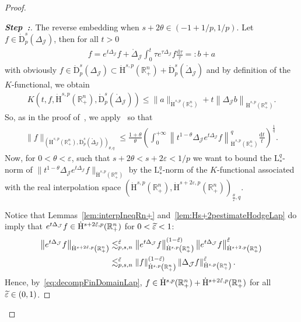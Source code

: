 \documentclass[AHL,Unicode,longabstracts,published]{cedram}
\newcommand{\bbR}{\mathbb{R}}
\newcommand{\rmH}{\mathrm{H}}%
\newcommand{\rmd}{\mathrm{d}}
\newcommand{\rmD}{\mathrm{D}}
\newcommand{\rmL}{\mathrm{L}}
\newcommand{\clJ}{\mathcal{J}}
\newcounter{stepcount}
\newenvironment{step}{\refstepcounter{stepcount}\begin{proof}[\textbf{Step~\thestepcount:}]}{\let\qed\relax\end{proof}}
\let\oldtilde\tilde
\renewcommand*{\tilde}[1]{\mathchoice{\widetilde{#1}}{\widetilde{#1}}{\oldtilde{#1}}{\oldtilde{#1}}}
\begin{document}
\begin{proof}
\begin{step}\label{prfprop3.12stp2}
The reverse embedding when $s+2\theta\in(-1+1/p,1/p)$. Let $f\in \dot{\rmD}^{s}_{p}({{\Delta}}_{\clJ})$, then for all $t>0$
\begin{align}\label{eq:decompFinDomainLap}
f = e^{t\Delta_{\clJ}}f + \mathring{\Delta}_{\clJ}\int_{0}^{t} \tau e^{\tau\Delta_{\clJ}}f \frac{\rmd\tau}{\tau} =: b + a
\end{align}
with obviously $f\in \dot{\rmD}^{s}_{p}({{\Delta}}_{\clJ})\subset \dot{\rmH}^{s,p}(\bbR^n_+)+\dot{\rmD}^{s}_{p}(\mathring{\Delta}_\clJ)$ and by definition of the $K$-functional, we obtain
\begin{align*}
K\left(t,f,\dot{\rmH}^{s,p}\left(\bbR^n_+\right),\dot{\rmD}^{s}_{p}\left(\mathring{\Delta}_\clJ\right)\right) \leqslant \| a \|_{\dot{\rmH}^{s,p}\left(\bbR^n_+\right)} + t\left\| {\Delta}_\clJ b \right\|_{\dot{\rmH}^{s,p}\left(\bbR^n_+\right)} .
\end{align*}
So, as in the proof of~\cite[Proposition~4.12]{DanchinHieberMuchaTolk2020}, we apply~\cite[Lemma~2.11]{DanchinHieberMuchaTolk2020} so that
\begin{align}\label{eq:referenceEstimate}
\| f \|_{\left(\dot{\rmH}^{s,p}\left(\bbR^n_+\right),
\dot{\rmD}^{s}_{p}\left(\mathring{\Delta}_\clJ\right)\right)_{\theta,q}} \leqslant \frac{1+\theta}{\theta} \left(\int_{0}^{+\infty} \left\| t^{1-\theta} \Delta_{\clJ}e^{t\Delta_{\clJ}} f\right\|_{\dot{\rmH}^{s,p}\left(\bbR^n_+\right)}^q \frac{\rmd t}{t} \right)^\frac{1}{q} .
\end{align}
Now, for $0<\theta<\varepsilon$, such that $s+2\theta<s+2\varepsilon<1/p$ we want to bound the $\rmL^q_\ast$-norm of $\| t^{1-\theta} \Delta_{\clJ}e^{t\Delta_{\clJ}} f\|_{\dot{\rmH}^{s,p}(\bbR^n_+)}$ by the $\rmL^q_\ast$-norm of the $K$-functional associated with the real interpolation space $(\dot{\rmH}^{s,p}(\bbR^n_+),\dot{\rmH}^{s+2\varepsilon,p}(\bbR^n_+))_{\frac{\theta}{\varepsilon},q}$.

Notice that Lemmas~\ref{lem:interpIneqRn+} and~\ref{lem:Hs+2pestimateHodgeLap} do imply that $e^{t\Delta_\clJ}f\in \dot{\rmH}^{s+2\tilde{\varepsilon},p}(\bbR^n_+)$ for $0<\tilde{\varepsilon}<1$:
\begin{align*}
\left\| e^{t\Delta_\clJ}f\right\|_{\dot{\rmH}^{s+2\tilde{\varepsilon},p}\left(\bbR^n_+\right)}&\lesssim_{p,s,n}^{\tilde{\varepsilon}}
\left\| e^{t\Delta_\clJ}f\right\|_{\dot{\rmH}^{s,p}\left(\bbR^n_+\right)}^{\left(1-\tilde{\varepsilon}\right)}\left\| e^{t\Delta_\clJ}f\right\|_{\dot{\rmH}^{s+2,p}\left(\bbR^n_+\right)}^{\tilde{\varepsilon}}\\
&\lesssim_{p,s,n}^{\tilde{\varepsilon}}\| f\|_{\dot{\rmH}^{s,p}\left(\bbR^n_+\right)}^{\left(1-\tilde{\varepsilon}\right)}\left\| \Delta_\clJ f\right\|_{\dot{\rmH}^{s,p}\left(\bbR^n_+\right)}^{\tilde{\varepsilon}}.
\end{align*}
Hence, by~\eqref{eq:decompFinDomainLap}, $f\in \dot{\rmH}^{s,p}(\bbR^n_+)+\dot{\rmH}^{s+2\tilde{\varepsilon},p}(\bbR^n_+)$ for all $\Tilde{\varepsilon}\in(0,1)$.


\end{step}
\end{proof}
\end{document}

